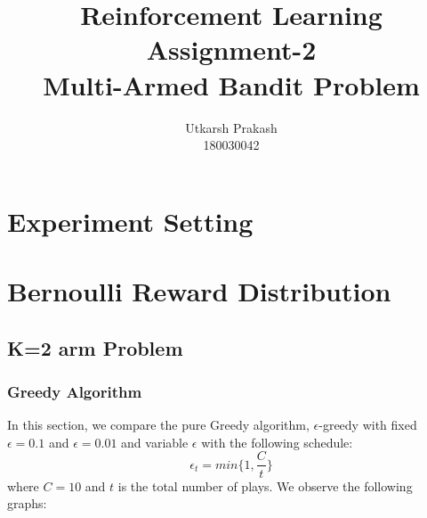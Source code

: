 \documentclass{article}
\title{Reinforcement Learning Assignment-2 \\
	\Large Multi-Armed Bandit Problem \\}
\begin{document}
\author{Utkarsh Prakash \\ \normalsize 180030042}
\maketitle
\section{Experiment Setting}
\section{Bernoulli Reward Distribution}
	\subsection{K=2 arm Problem}
		\subsubsection{Greedy Algorithm}
		
		In this section, we compare the pure Greedy algorithm, $\epsilon$-greedy with fixed $\epsilon=0.1$ and $\epsilon=0.01$ and variable $\epsilon$ with the 
		following schedule:
		\begin{equation}
		\nonumber
			\epsilon_{t} = min\{1, \frac{C}{t}\}
		\end{equation}
		where $C=10$ and $t$ is the total number of plays. We observe the following graphs:
		
\end{document}
